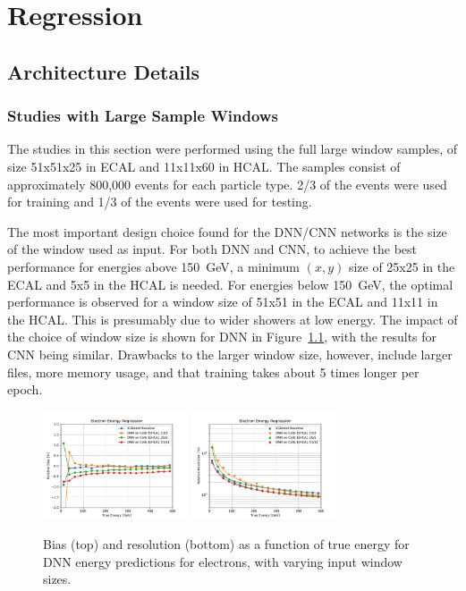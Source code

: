 \chapter{Regression}
\label{sec:regression}

\section{Architecture Details}

\subsection*{Studies with Large Sample Windows}

The studies in this section were performed using the full large window samples, of size 51x51x25 in ECAL and 11x11x60 in HCAL.
The samples consist of approximately 800,000 events for each particle type.  2/3 of the events were used for training and 1/3 of the events were used for testing.

The most important design choice found for the DNN/CNN networks is the size of the window used as input.  For both DNN and CNN, to achieve the best performance for energies above 150~GeV, a minimum $(x,y)$ size of 25x25 in the ECAL and 5x5 in the HCAL is needed.  For energies below 150~GeV, the optimal performance is observed for a window size of 51x51 in the ECAL and 11x11 in the HCAL.  This is presumably due to wider showers at low energy.  The impact of the choice of window size is shown for DNN in Figure~\ref{fig:reg_dnn_numcells}, with the results for CNN being similar.  Drawbacks to the larger window size, however, include larger files, more memory usage, and that training takes about 5 times longer per epoch.

\begin{figure}[htbp]
\centering
\includegraphics[width=0.38\textwidth]{Images/Calo/bias_vs_E_EleFixed_nn_numcells_zoom.pdf}
\includegraphics[width=0.38\textwidth]{Images/Calo/res_vs_E_EleFixed_nn_numcells_fits.pdf}
\caption{Bias (top) and resolution (bottom) as a function of true energy for DNN energy predictions for electrons, with varying input window sizes.
}
\label{fig:reg_dnn_numcells}
\end{figure}

